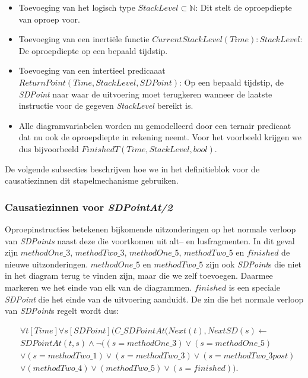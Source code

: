 \begin{itemize}
	\item Toevoeging van het logisch type $StackLevel \subset \mathbb{N}$: Dit stelt de oproepdiepte van oproep voor.
	\item Toevoeging van een inerti\"ele functie $CurrentStackLevel(Time) : StackLevel$: De oproepdiepte op een bepaald tijdstip.
	\item Toevoeging van een intertieel predicaaat $ReturnPoint(Time, StackLevel, SDPoint)$: Op een bepaald tijdstip, de \textit{SDPoint} naar waar de uitvoering moet terugkeren wanneer de laatste instructie voor de gegeven \textit{StackLevel} bereikt is.
	\item Alle diagramvariabelen worden nu gemodelleerd door een ternair predicaat dat nu ook de oproepdiepte in rekening neemt. Voor het voorbeeld krijgen we dus bijvoorbeeld $FinishedT(Time, StackLevel, bool)$.
\end{itemize}

De volgende subsecties beschrijven hoe we in het definitieblok voor de causatiezinnen dit stapelmechanisme gebruiken.

\subsubsection{Causatiezinnen voor \textit{SDPointAt/2}}\label{sec:sd-rec-cause}
Oproepinstructies betekenen bijkomende uitzonderingen op het normale verloop van \textit{SDPoints} naast deze die voortkomen uit alt-- en lusfragmenten. In dit geval zijn $methodOne\_3$, $methodTwo\_3$, $methodOne\_5$, $methodTwo\_5$ en $finished$ de nieuwe uitzonderingen. $methodOne\_5$ en $methodTwo\_5$ zijn ook \textit{SDPoint}s die niet in het diagram terug te vinden zijn, maar die we zelf toevoegen. Daarmee markeren we het einde van elk van de diagrammen. $finished$ is een speciale \textit{SDPoint} die het einde van de uitvoering aanduidt. De zin die het normale verloop van \textit{SDPoint}s regelt wordt dus:

\begin{align}
	& \nonumber \forall{t}[Time]\forall{s}[SDPoint](C\_SDPointAt(Next(t), NextSD(s) \leftarrow \\ \nonumber &SDPointAt(t,s) \land \lnot((s = methodOne\_3) \lor (s = methodOne\_5) \\ \nonumber &\lor (s = methodTwo\_1) \lor (s = methodTwo\_3) \lor (s = methodTwo\_3post) \\ &\lor (methodTwo\_4) \lor (methodTwo\_5) \lor (s = finished)).
\end{align}

